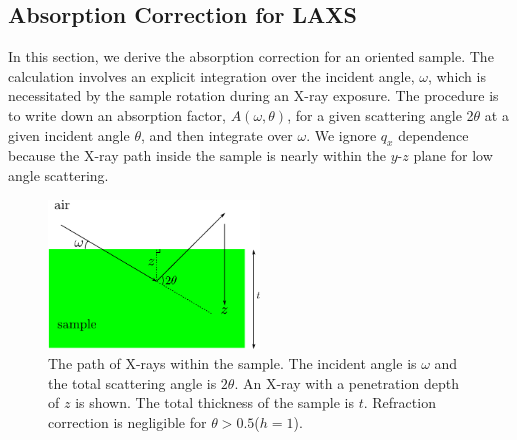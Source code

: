 \subsection{Absorption Correction for LAXS}\label{sec:absorption_correction}
In this section, we derive the absorption correction for an oriented sample. 
The calculation involves an explicit integration over the incident angle, 
$\omega$, which is necessitated by the sample rotation during an X-ray exposure. 
The procedure is to write down an absorption factor, $A(\omega,\theta)$, for a 
given scattering angle 2$\theta$ at a given incident angle $\theta$, and
then integrate over $\omega$. We ignore $q_x$ dependence because the X-ray
path inside the sample is nearly within the $y$-$z$ plane for low angle
scattering. 

\begin{figure}[htbp]
  \centering
  \includegraphics[width=0.5\textwidth]{figures/ripple/analysis/absorption_LAXS}
  \caption[The path of X-rays within the sample]
  {The path of X-rays within the sample. The incident angle is 
  $\omega$ and the total scattering angle is $2\theta$. An X-ray with a
  penetration depth of $z$ is shown. The total thickness of the sample
  is $t$. Refraction correction is negligible for 
  $\theta > 0.5$\textdegree ($h=1$).}
  \label{fig:absorption_LAXS}
\end{figure}

